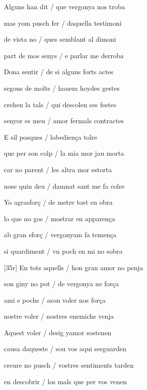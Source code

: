 \documentclass[12pt]{article}
\begin{document}
\begin{estrofa}

 Alguns han dit / que vergonya nos troba

 mas yom pusch fer / daquella testimoni

 de vista no / ques semblant al dimoni

 part de mos senys / e parlar me derroba

 Dona sentir / de si alguns forts actes

 segons de molts / hauem hoydes gestes

 crehen la tals / qui descolen ses festes

 senyor es meu / amor fermals contractes

\end{estrofa}



\begin{estrofa}

 E sil posques / lobedien\c{c}a tolre

 que per son colp / la mia mor jau morta

 car no parent / les altra mor estorta

 nose quin deu / damnat sant me fa colre

 Yo agrasfor\c{c} / de metre tost en obra

 lo que no gos / mostrar en apparen\c{c}a

 ab gran sfor\c{c} / vergonyam fa temen\c{c}a

 si quardiment / vn poch en mi no sobra

\end{estrofa}



\begin{estrofa}

 [35r] En tots aquells / hon gran amor no penja

 son giny no pot / de vergonya ne for\c{c}a

 ami e pochs / ason voler nos for\c{c}a

 nostre voler / nostres enemichs venja

 Aquest voler / desig yamor sostenen

 causa daquests / sou vos aqui sesguarden

 creure no pusch / vostres sentiments tarden

 en descobrir / los mals que per vos venen

\end{estrofa}
\end{document}
